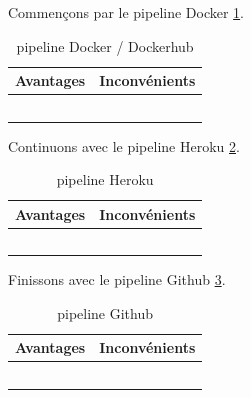 \documentclass[
    iai, %
    il, %
]{heig-tb}
\begin{document}
Commençons par le pipeline Docker \ref{devops-dockerhub}.
\begin{table}[h]
    \begin{center}
        \caption{pipeline Docker / Dockerhub \label{devops-dockerhub}}
        \begin{tabularx}{1.0\textwidth} {X|X}
            Avantages & Inconvénients \\ \hline
                      &               \\
                      &               \\
                      &               \\
                      &               \\
                      &               \\
        \end{tabularx}
    \end{center}
\end{table}

Continuons avec le pipeline Heroku \ref{devops-heroku}.
\begin{table}[h]
    \begin{center}
        \caption{pipeline Heroku \label{devops-heroku}}
        \begin{tabularx}{1.0\textwidth} {X|X}
            Avantages & Inconvénients \\ \hline
                      &               \\
                      &               \\
                      &               \\
                      &               \\
                      &               \\
        \end{tabularx}
    \end{center}
\end{table}

Finissons avec le pipeline Github \ref{devops-github}.
\begin{table}[h]
    \begin{center}
        \caption{pipeline Github \label{devops-github}}
        \begin{tabularx}{1.0\textwidth} {X|X}
            Avantages & Inconvénients \\ \hline
                      &               \\
                      &               \\
                      &               \\
                      &               \\
                      &               \\
        \end{tabularx}
    \end{center}
\end{table}
\end{document}
